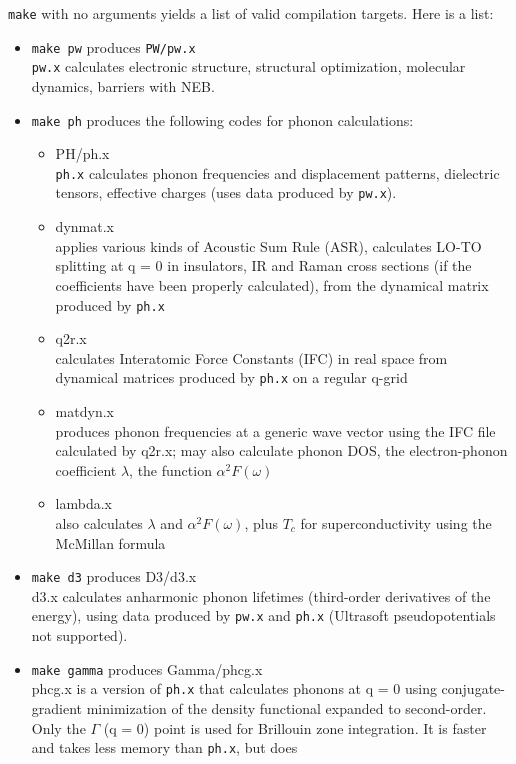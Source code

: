 \documentclass[12pt,a4paper]{article}
\def\pw.x{\texttt{pw.x}}
\def\ph.x{\texttt{ph.x}}
\begin{document}
\texttt{make} with no arguments yields a list of valid compilation targets. 
Here is a list:
\begin{itemize}
\item \texttt{make pw} produces \texttt{PW/pw.x} \\
\pw.x calculates electronic structure, structural optimization, molecular dynamics, barriers with NEB.
\item \texttt{make ph} produces the following codes for phonon calculations:
\begin{itemize}
  \item PH/ph.x\\
    \ph.x calculates phonon frequencies and displacement patterns,
    dielectric tensors, effective charges (uses data produced by \pw.x). 
  \item dynmat.x\\
    applies various kinds of Acoustic Sum Rule (ASR),
    calculates LO-TO splitting at q = 0 in insulators, IR and Raman
    cross sections (if the coefficients have been properly calculated),
    from the dynamical matrix produced by \ph.x 
  \item q2r.x\\
    calculates Interatomic Force Constants (IFC) in real space
    from dynamical matrices produced by \ph.x on a regular q-grid 
 \item  matdyn.x\\
    produces phonon frequencies at a generic wave vector
    using the IFC file calculated by q2r.x; may also calculate phonon DOS, 
    the electron-phonon coefficient $\lambda$, the function $\alpha^2F(\omega)$
\item lambda.x\\
   also calculates $\lambda$ and $\alpha^2F(\omega)$, plus $T_c$ for 
   superconductivity using the McMillan formula
  \end{itemize}
\item \texttt{make d3} produces D3/d3.x\\
  d3.x calculates anharmonic phonon lifetimes (third-order derivatives
  of the energy), using data produced by \pw.x and \ph.x (Ultrasoft
  pseudopotentials not supported). 
\item \texttt{make gamma} produces Gamma/phcg.x\\
  phcg.x is a version of \ph.x that calculates phonons at q = 0 using
  conjugate-gradient minimization of the density functional expanded to
  second-order. Only the $\Gamma$ (q = 0) point is used for Brillouin zone
  integration. It is faster and takes less memory than \ph.x, but does

\end{itemize}
\end{document}
